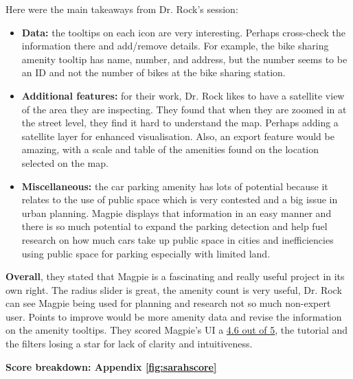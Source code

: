 \newpage{}

Here were the main takeaways from Dr. Rock's session:
\begin{itemize}
\item \textbf{Data:} the tooltips on each icon are very interesting. Perhaps
cross-check the information there and add/remove details. For example, the bike
sharing amenity tooltip has name, number, and address, but the number seems to
be an ID and not the number of bikes at the bike sharing station.
\vspace{0.2cm}
    \item \textbf{Additional features:} for their work, Dr. Rock likes to have a
          satellite view of the area they are inspecting. They found that when they
          are zoomed in at the street level, they find it hard to understand the map.
          Perhaps adding a satellite layer for enhanced visualisation. Also, an
          export feature would be amazing, with a scale and table of the amenities
          found on the location selected on the map.
          \vspace{0.2cm}
          
    \item \textbf{Miscellaneous:} the car parking amenity has lots of potential
          because it relates to the use of public space which is very contested and a
          big issue in urban planning. Magpie displays that information in an easy
          manner and there is so much potential to expand the parking detection and
          help fuel research on how much cars take up public space in cities and
          inefficiencies using public space for parking especially with limited land.
          
\end{itemize}

\textbf{Overall}, they stated that Magpie is a fascinating and really useful
project in its own right. The radius slider is great, the amenity count is very
useful, Dr. Rock can see Magpie being used for planning and research not so much
non-expert user. Points to improve would be more amenity data and revise the
information on the amenity tooltips. They scored Magpie's UI a \underline{4.6
    out of 5}, the tutorial and the filters losing a star for lack of clarity and
intuitiveness.

\hspace{2em}\textbf{Score breakdown: Appendix \ref{fig:sarahscore}}

\newpage{}

